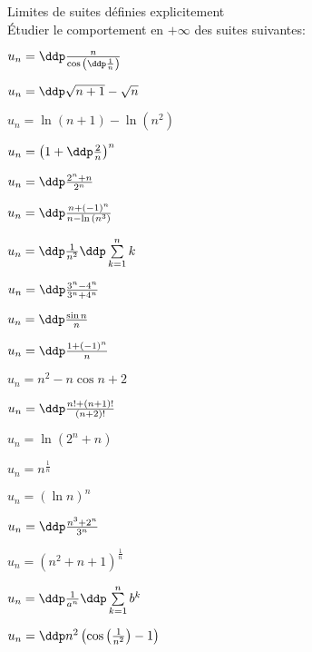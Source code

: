 
\begin{exercice} \; Limites de suites d\'efinies explicitement\\
\noindent \'Etudier le comportement en $+\infty$ des suites suivantes:\\
\begin{enumerate}
\begin{minipage}[t]{0.3\textwidth}
\item
$u_n=\ddp\frac{n}{\cos{\left(\ddp\frac{1}{n}  \right)}}$
\item
$u_n=\ddp\sqrt{n+1}-\sqrt{n}$
\item 
$u_n=\ln{(n+1)}-\ln{(n^2)}$
\item  
$u_n=\left(1+\ddp\frac{2}{n}\right)^n$
\item  
$u_n=\ddp\frac{2^n+n}{2^n}$
\item  $u_n=\ddp\frac{n+(-1)^n}{n-\ln{(n^3)}}$
\end{minipage}
\begin{minipage}[t]{0.3\textwidth}
\item  
$u_n=\ddp\frac{1}{n^2}\ddp \sum\limits_{k=1}^n k$
 \item 
$u_n=\ddp\frac{3^n-4^n}{3^n+4^n}$
\item  
$u_n=\ddp\frac{\sin{n}}{n}$
\item  
$u_n=\ddp\frac{1+(-1)^n}{n}$
\item  
$u_n=n^2-n\cos{n}+2$
\item  $u_n=\ddp\frac{n!+(n+1)!}{(n+2)!}$
\end{minipage}
\begin{minipage}[t]{0.3\textwidth}
 \item 
$u_n=\ln{(2^n+n)}$
\item $u_n=n^{\frac{1}{n}}$  
\item   $u_n=(\ln{n})^n$
\item  $u_n=\ddp\frac{n^3+2^n}{3^n}$ 
\item $u_n=(n^2+n+1)^{\frac{1}{n}}$  
\item $u_n=\ddp\frac{1}{a^n}\ddp \sum\limits_{k=1}^n b^k$  
\item $u_n = \ddp n^2 \left(\cos\left(\frac{1}{n^2}\right)-1\right)$
\end{minipage}
\end{enumerate}
\end{exercice}